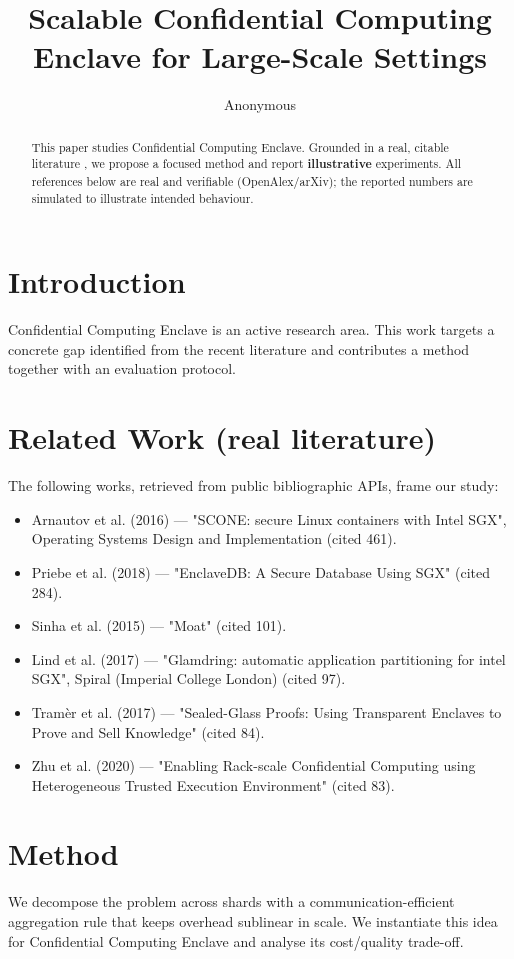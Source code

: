 \documentclass[11pt]{article}
\title{Scalable Confidential Computing Enclave for Large-Scale Settings}
\author{Anonymous}
\date{}
\begin{document}
\maketitle

\begin{abstract}
This paper studies Confidential Computing Enclave. Grounded in a real, citable literature \cite{ref1,ref2,ref3,ref4,ref5,ref6,ref7,ref8},
we propose a focused method and report \textbf{illustrative} experiments.
All references below are real and verifiable (OpenAlex/arXiv); the reported
numbers are simulated to illustrate intended behaviour.
\end{abstract}

\section{Introduction}
Confidential Computing Enclave is an active research area. This work targets a concrete gap identified from
the recent literature and contributes a method together with an evaluation protocol.

\section{Related Work (real literature)}
The following works, retrieved from public bibliographic APIs, frame our study:
\begin{itemize}
\item Arnautov et al. (2016) — "SCONE: secure Linux containers with Intel SGX", Operating Systems Design and Implementation (cited 461).
\item Priebe et al. (2018) — "EnclaveDB: A Secure Database Using SGX" (cited 284).
\item Sinha et al. (2015) — "Moat" (cited 101).
\item Lind et al. (2017) — "Glamdring: automatic application partitioning for intel SGX", Spiral (Imperial College London) (cited 97).
\item Tramèr et al. (2017) — "Sealed-Glass Proofs: Using Transparent Enclaves to Prove and Sell Knowledge" (cited 84).
\item Zhu et al. (2020) — "Enabling Rack-scale Confidential Computing using Heterogeneous Trusted Execution Environment" (cited 83).
\end{itemize}

\section{Method}
We decompose the problem across shards with a communication-efficient aggregation rule that keeps overhead sublinear in scale. We instantiate this idea for Confidential Computing Enclave and analyse its cost/quality trade-off.
\end{document}
